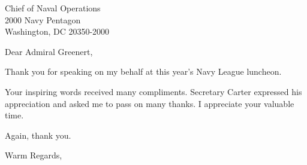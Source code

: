 \documentclass[12pt]{wrceletter}
\date{\printdate{2015-02-12}}
\begin{document}
\begin{letter}{%
Chief of Naval Operations\\
2000 Navy Pentagon\\
Washington, DC 20350-2000}

\opening{Dear Admiral Greenert,}

Thank you for speaking on my behalf at this year’s Navy League
luncheon.

Your inspiring words received many compliments. Secretary
Carter expressed his appreciation and asked me to pass on many
thanks. I appreciate your valuable time.
 
Again, thank you.

\closing{Warm Regards,}

\end{letter}
\end{document}
